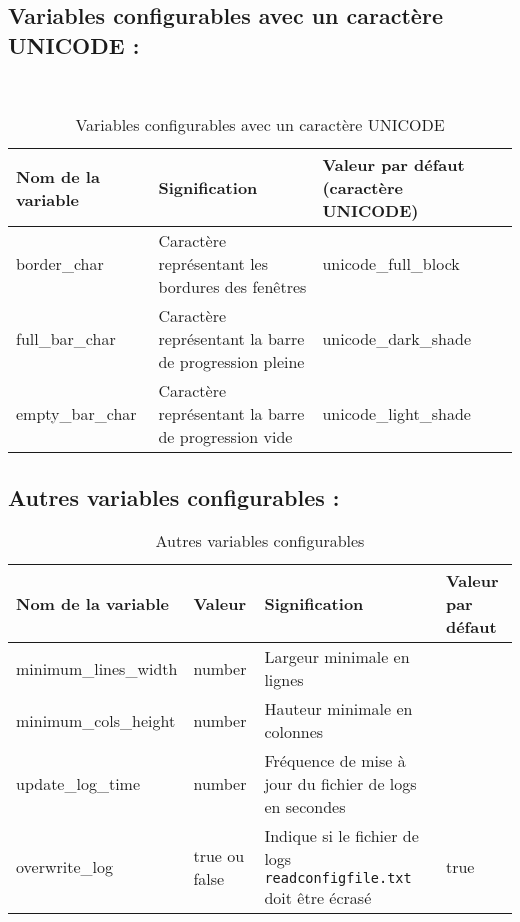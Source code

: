 \documentclass{article}
\begin{document}
\subsection{Variables configurables avec un caractère UNICODE :}
\
\begin{table}[h!]
    \centering
    \renewcommand{\arraystretch}{1.5}
    \footnotesize
    \begin{tabular}{|>{\centering\arraybackslash}m{3cm}|>{\centering\arraybackslash}m{3cm}|>{\centering\arraybackslash}m{3cm}|}
        \hline
        \textbf{Nom de la variable} & \textbf{Signification} & \textbf{Valeur par défaut (caractère UNICODE)} \\
        \hline
        border\_char & Caractère représentant les bordures des fenêtres & unicode\_full\_block \\
        \hline
        full\_bar\_char & Caractère représentant la barre de progression pleine & unicode\_dark\_shade \\
        \hline
        empty\_bar\_char & Caractère représentant la barre de progression vide & unicode\_light\_shade \\
        \hline
    \end{tabular}
    \label{tab:configable_unicode_var}
    \caption{Variables configurables avec un caractère UNICODE}
\end{table}

\subsection{Autres variables configurables :}
\begin{table}[h!]
    \centering
    \renewcommand{\arraystretch}{1.5}
    \footnotesize
    \begin{tabular}{|>{\centering\arraybackslash}m{3cm}|>{\centering\arraybackslash}m{1.6cm}|>{\centering\arraybackslash}m{3cm}|>{\centering\arraybackslash}m{1.6cm}|}
        \hline
        \textbf{Nom de la variable} & \textbf{Valeur} & \textbf{Signification} & \textbf{Valeur par défaut} \\
        \hline
        minimum\_lines\_width & number & Largeur minimale en lignes & 30 \\
        \hline
        minimum\_cols\_height & number & Hauteur minimale en colonnes & 70 \\
        \hline
        update\_log\_time & number & Fréquence de mise à jour du fichier de logs en secondes & 60 \\
        \hline
        overwrite\_log & true ou false & Indique si le fichier de logs \texttt{readconfigfile.txt} doit être écrasé & true \\
        \hline
    \end{tabular}
    \label{tab:configable_other_var}
    \caption{Autres variables configurables}
\end{table}
\end{document}
